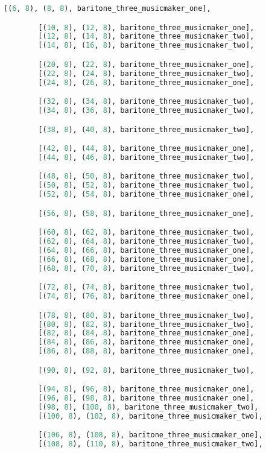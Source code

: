 \begin{lstlisting}[language=Python, caption=Invocation Source Code]
        [(6, 8), (8, 8), baritone_three_musicmaker_one],

        [(10, 8), (12, 8), baritone_three_musicmaker_one],
        [(12, 8), (14, 8), baritone_three_musicmaker_two],
        [(14, 8), (16, 8), baritone_three_musicmaker_two],

        [(20, 8), (22, 8), baritone_three_musicmaker_one],
        [(22, 8), (24, 8), baritone_three_musicmaker_two],
        [(24, 8), (26, 8), baritone_three_musicmaker_one],

        [(32, 8), (34, 8), baritone_three_musicmaker_two],
        [(34, 8), (36, 8), baritone_three_musicmaker_two],

        [(38, 8), (40, 8), baritone_three_musicmaker_two],

        [(42, 8), (44, 8), baritone_three_musicmaker_one],
        [(44, 8), (46, 8), baritone_three_musicmaker_two],

        [(48, 8), (50, 8), baritone_three_musicmaker_two],
        [(50, 8), (52, 8), baritone_three_musicmaker_two],
        [(52, 8), (54, 8), baritone_three_musicmaker_one],

        [(56, 8), (58, 8), baritone_three_musicmaker_one],

        [(60, 8), (62, 8), baritone_three_musicmaker_two],
        [(62, 8), (64, 8), baritone_three_musicmaker_two],
        [(64, 8), (66, 8), baritone_three_musicmaker_one],
        [(66, 8), (68, 8), baritone_three_musicmaker_one],
        [(68, 8), (70, 8), baritone_three_musicmaker_two],

        [(72, 8), (74, 8), baritone_three_musicmaker_two],
        [(74, 8), (76, 8), baritone_three_musicmaker_one],

        [(78, 8), (80, 8), baritone_three_musicmaker_two],
        [(80, 8), (82, 8), baritone_three_musicmaker_two],
        [(82, 8), (84, 8), baritone_three_musicmaker_one],
        [(84, 8), (86, 8), baritone_three_musicmaker_one],
        [(86, 8), (88, 8), baritone_three_musicmaker_one],

        [(90, 8), (92, 8), baritone_three_musicmaker_two],

        [(94, 8), (96, 8), baritone_three_musicmaker_one],
        [(96, 8), (98, 8), baritone_three_musicmaker_one],
        [(98, 8), (100, 8), baritone_three_musicmaker_two],
        [(100, 8), (102, 8), baritone_three_musicmaker_two],

        [(106, 8), (108, 8), baritone_three_musicmaker_one],
        [(108, 8), (110, 8), baritone_three_musicmaker_two],


\end{lstlisting}

